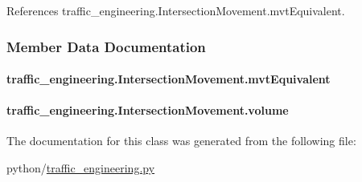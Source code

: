 References traffic\-\_\-engineering.\-Intersection\-Movement.\-mvt\-Equivalent.



\subsubsection{Member Data Documentation}
\hypertarget{classtraffic__engineering_1_1IntersectionMovement_acddb31d7563b35067734ae07faa10de0}{
\paragraph[{mvt\-Equivalent}]{\setlength{\rightskip}{0pt plus 5cm}traffic\-\_\-engineering.\-Intersection\-Movement.\-mvt\-Equivalent}}\label{classtraffic__engineering_1_1IntersectionMovement_acddb31d7563b35067734ae07faa10de0}
\hypertarget{classtraffic__engineering_1_1IntersectionMovement_a57c9f52a7252a30f9e7859e8bcb8006c}{
\paragraph[{volume}]{\setlength{\rightskip}{0pt plus 5cm}traffic\-\_\-engineering.\-Intersection\-Movement.\-volume}}\label{classtraffic__engineering_1_1IntersectionMovement_a57c9f52a7252a30f9e7859e8bcb8006c}


The documentation for this class was generated from the following file\-:\begin{DoxyCompactItemize}
\item 
python/\hyperlink{traffic__engineering_8py}{traffic\-\_\-engineering.\-py}\end{DoxyCompactItemize}

